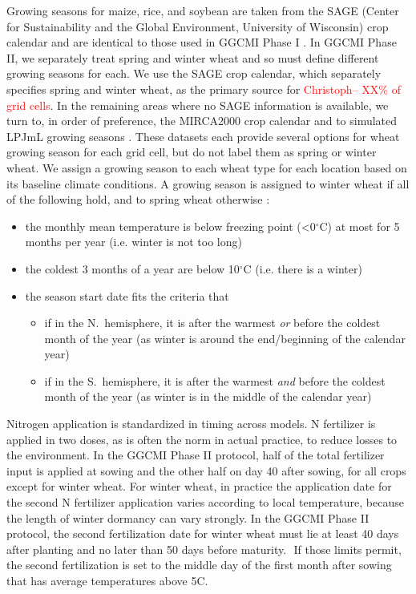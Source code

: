 \documentclass[gmd, manuscript]{copernicus} %
\begin{document}
Growing seasons for maize, rice, and soybean are taken from the SAGE (Center for Sustainability and the Global Environment, University of Wisconsin) crop calendar \citep{Sacks2010} and are identical to those used in GGCMI Phase I \citep{Elliott2015}.
In GGCMI Phase II, we separately treat spring and winter wheat and so must define different growing seasons for each.
We use the SAGE crop calendar, which separately specifies spring and winter wheat, as the primary source for \textcolor{red}{Christoph-- XX\% of grid cells}. 
In the remaining areas where no SAGE information is available, we turn to, in order of preference, the MIRCA2000 crop calendar \citep{Portmann2010} and to simulated LPJmL growing seasons \citep{waha2012climate}.  
These datasets each provide several options for wheat growing season for each grid cell, but do not label them as spring or winter wheat. We assign a growing season to each wheat type for each location based on its baseline climate conditions. 
A growing season is assigned to winter wheat if all of the following hold, and to spring wheat otherwise :
\begin{itemize} %
\item the monthly mean temperature is below freezing point (<0$^\circ$C) at most for 5 months per year (i.e. winter is not too long)
\item the coldest 3 months of a year are below 10$^\circ$C (i.e. there is a winter)
\item the season start date fits the criteria that
  \begin{itemize} 
    \item if in the N.\ hemisphere, it is after the warmest \textit{or} before the coldest month of the year (as winter is around the end/beginning of the calendar year)
    \item if in the S.\ hemisphere, it is after the warmest \textit{and} before the coldest month of the year (as winter is in the middle of the calendar year)
    \end{itemize}
\end{itemize}

Nitrogen application is standardized in timing across models. 
N fertilizer is applied in two doses, as is often the norm in actual practice, to reduce losses to the environment. 
In the GGCMI Phase II protocol, half of the total fertilizer input is applied at sowing and the other half on day 40 after sowing, for all crops except for winter wheat. 
For winter wheat, in practice the application date for the second N fertilizer application varies according to local temperature, because the length of winter dormancy can vary strongly. 
In the GGCMI Phase II protocol, the second fertilization date for winter wheat must lie at least 40 days after planting and no later than 50 days before maturity. 
If those limits permit, the second fertilization is set to the middle day of the first month after sowing that has average temperatures above 5C.
\end{document}
